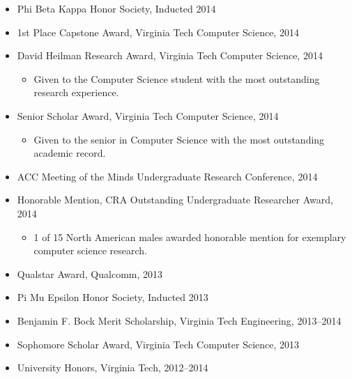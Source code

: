 \documentclass[11pt,letter,sans]{moderncv}
\begin{document}
  \begin{itemize}
  
    \item Phi Beta Kappa Honor Society, Inducted 2014
    
  
    \item 1st Place Capstone Award, Virginia Tech Computer Science, 2014
    
  
    \item David Heilman Research Award, Virginia Tech Computer Science, 2014
    
      \begin{itemize}
      \item {Given to the Computer Science student with the most outstanding research experience.}
      \end{itemize}
    
  
    \item Senior Scholar Award, Virginia Tech Computer Science, 2014
    
      \begin{itemize}
      \item {Given to the senior in Computer Science with the most outstanding academic record.}
      \end{itemize}
    
  
    \item ACC Meeting of the Minds Undergraduate Research Conference, 2014
    
  
    \item Honorable Mention, CRA Outstanding Undergraduate Researcher Award, 2014
    
      \begin{itemize}
      \item {1 of 15 North American males awarded honorable mention for exemplary computer science research.}
      \end{itemize}
    
  
    \item Qualstar Award, Qualcomm, 2013
    
  
    \item Pi Mu Epsilon Honor Society, Inducted 2013
    
  
    \item Benjamin F. Bock Merit Scholarship, Virginia Tech Engineering, 2013--2014
    
  
    \item Sophomore Scholar Award, Virginia Tech Computer Science, 2013
    
  
    \item University Honors, Virginia Tech, 2012--2014
    

\end{itemize}
\end{document}
